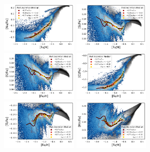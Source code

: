 \documentclass[fleqn,usenatbib]{mnras}
\begin{document}
\begin{figure}
    \includegraphics[width=0.33\textwidth]{figures/xfe_feh_zones_Na.png}
    \includegraphics[width=0.33\textwidth]{figures/xfe_feh_zones_Si.png}
    \includegraphics[width=0.33\textwidth]{figures/xfe_feh_zones_S.png}
    \includegraphics[width=0.33\textwidth]{figures/xfe_feh_zones_Cl.png}
    \includegraphics[width=0.33\textwidth]{figures/xfe_feh_zones_Ti.png}
    \includegraphics[width=0.33\textwidth]{figures/xfe_feh_zones_Mn.png}

\end{figure}
\end{document}
